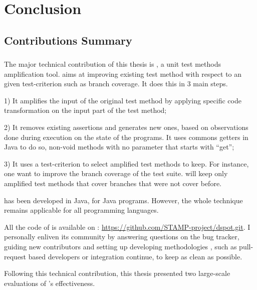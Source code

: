 \chapter{Conclusion}
\label{chap:conclusion}

\minitoc

\graphicspath{{.}{chapitres/conclusion/}}

\section{Contributions Summary}
\label{sec:conclusion:contributions-summary}

\subsection{\dspot}
\label{subsec:conclusion:contributions-summary:dspot}

The major technical contribution of this thesis is \dspot, a unit test methods amplification tool.
\dspot aims at improving existing test method with respect to an given test-criterion such as branch coverage.
It does this in 3 main steps.

1) It amplifies the input of the original test method by applying specific code transformation on the input part of the test method;

2) It removes existing assertions and generates new ones, based on observations done during execution on the state of the programs.
It uses commons getters in Java to do so, \eg non-void methods with no parameter that starts with ``get'';

3) It uses a test-criterion to select amplified test methods to keep.
For instance, one want to improve the branch coverage of the test suite.
\dspot will keep only amplified test methods that cover branches that were not cover before.

\dspot has been developed in Java, for Java programs.
However, the whole technique remains applicable for all programming languages.

All the code of \dspot is available on \gh: \url{https://github.com/STAMP-project/dspot.git}.
I personally enliven its community by answering questions on the bug tracker, guiding new contributors and setting up developing methodologies , such as pull-request based developers or integration continue, to keep \dspot as clean as possible.


Following this technical contribution, this thesis presented two large-scale evaluations of \dspot's effectiveness.

